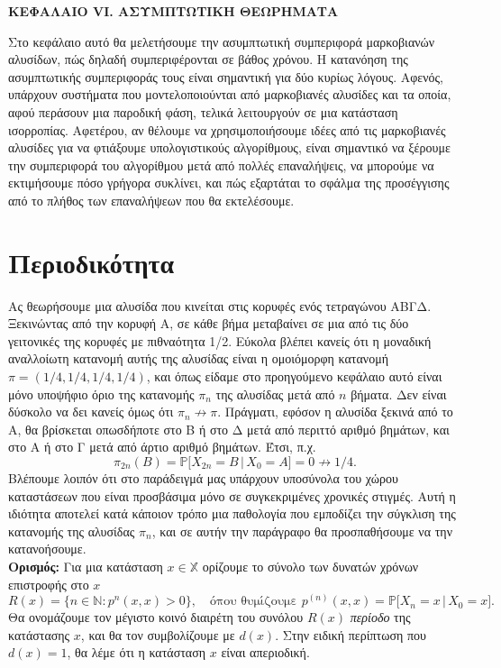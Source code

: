 \documentclass[11pt]{article}
\newcommand{\en}[1]{\textlatin{#1}}
\def\N{\mathbb{N}}
\def\X{\mathbb{X}}
\def\P{\mathbb{P}}
\newcommand{\PP}[1]{\P\big[#1\big]}
\begin{document}
\begin{center}
\Large {\bf KΕΦΑΛΑΙΟ \en{VI}. ΑΣΥΜΠΤΩΤΙΚΗ ΘΕΩΡΗΜΑΤΑ}
\end{center}
\noindent
\vspace{3mm}

\noindent
Στο κεφάλαιο αυτό θα μελετήσουμε την ασυμπτωτική συμπεριφορά μαρκοβιανών αλυσίδων, πώς δηλαδή συμπεριφέρονται σε βάθος χρόνου. Η κατανόηση της ασυμπτωτικής συμπεριφοράς τους είναι σημαντική για δύο κυρίως λόγους. Αφενός, υπάρχουν συστήματα που μοντελοποιούνται από μαρκοβιανές αλυσίδες και τα οποία, αφού περάσουν μια παροδική φάση, τελικά λειτουργούν σε μια κατάσταση ισορροπίας. Αφετέρου, αν θέλουμε να χρησιμοποιήσουμε ιδέες από τις μαρκοβιανές αλυσίδες για να φτιάξουμε υπολογιστικούς αλγορίθμους, είναι σημαντικό να ξέρουμε την συμπεριφορά του αλγορίθμου μετά από πολλές επαναλήψεις, να μπορούμε να εκτιμήσουμε πόσο γρήγορα συκλίνει, και πώς εξαρτάται το σφάλμα της προσέγγισης από το  πλήθος των επαναλήψεων που θα εκτελέσουμε. 
\section{Περιοδικότητα}\label{periodicity}
Ας θεωρήσουμε μια αλυσίδα που κινείται στις κορυφές ενός τετραγώνου ΑΒΓΔ. Ξεκινώντας από την κορυφή Α, σε κάθε βήμα μεταβαίνει σε μια από τις δύο γειτονικές της κορυφές με πιθναότητα 1/2. Εύκολα βλέπει κανείς ότι η μοναδική αναλλοίωτη κατανομή αυτής της αλυσίδας είναι η ομοιόμορφη κατανομή $\pi=(1/4,1/4,1/4,1/4)$, και όπως είδαμε στο προηγούμενο κεφάλαιο αυτό είναι μόνο υποψήφιο όριο της κατανομής $\pi_n$ της αλυσίδας μετά από $n$ βήματα. Δεν είναι δύσκολο να δει κανείς όμως ότι $\pi_n\not\rightarrow\pi$. Πράγματι, εφόσον η αλυσίδα ξεκινά από το Α, θα βρίσκεται οπωσδήποτε στο B ή στο Δ μετά από περιττό αριθμό βημάτων, και στο Α ή στο Γ μετά από άρτιο αριθμό βημάτων. Έτσι,  π.χ. 
\[
\pi_{2n}(B)=\PP{X_{2n}=B\,|\,X_0=A}=0\not\rightarrow 1/4.
\] 
Βλέπουμε λοιπόν ότι στο παράδειγμά μας υπάρχουν υποσύνολα του χώρου καταστάσεων που είναι προσβάσιμα μόνο σε συγκεκριμένες χρονικές στιγμές. Αυτή η ιδιότητα αποτελεί κατά κάποιον τρόπο μια παθολογία που εμποδίζει την σύγκλιση της κατανομής της αλυσίδας $\pi_n$, και  σε αυτήν την παράγραφο θα προσπαθήσουμε να την κατανοήσουμε.\\

\noindent
{\bf Ορισμός:} Για μια κατάσταση $x\in\X$ ορίζουμε το σύνολο των δυνατών χρόνων επιστροφής στο $x$
\[
R(x)=\{n\in\N: p^{n}(x,x)>0\},\quad \text{όπου θυμίζουμε } p^{(n)}(x,x)=\PP{X_n=x\,|\,X_0=x}.
\]
Θα ονομάζουμε τον μέγιστο κοινό διαιρέτη του συνόλου $R(x)$ {\em περίοδο} της κατάστασης $x$, και θα τον συμβολίζουμε με $d(x)$.
Στην ειδική περίπτωση που $d(x)=1$, θα λέμε ότι η κατάσταση $x$ είναι απεριοδική.\\
\end{document}
